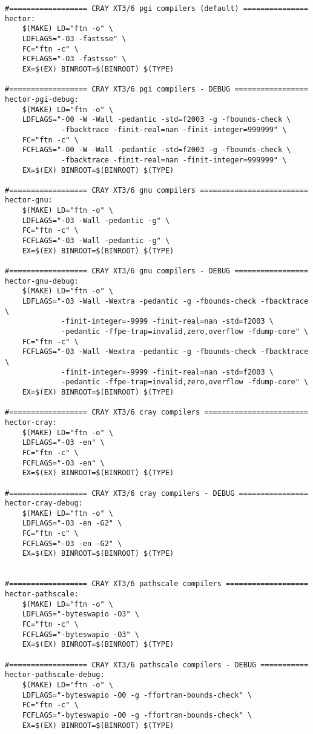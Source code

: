 \begin{verbatim}
#================== CRAY XT3/6 pgi compilers (default) ===============
hector:
	$(MAKE) LD="ftn -o" \
	LDFLAGS="-O3 -fastsse" \
	FC="ftn -c" \
	FCFLAGS="-O3 -fastsse" \
	EX=$(EX) BINROOT=$(BINROOT) $(TYPE)

#================== CRAY XT3/6 pgi compilers - DEBUG =================
hector-pgi-debug:
	$(MAKE) LD="ftn -o" \
	LDFLAGS="-O0 -W -Wall -pedantic -std=f2003 -g -fbounds-check \
	         -fbacktrace -finit-real=nan -finit-integer=999999" \
	FC="ftn -c" \
	FCFLAGS="-O0 -W -Wall -pedantic -std=f2003 -g -fbounds-check \
	         -fbacktrace -finit-real=nan -finit-integer=999999" \
	EX=$(EX) BINROOT=$(BINROOT) $(TYPE)

#================== CRAY XT3/6 gnu compilers =========================
hector-gnu:
	$(MAKE) LD="ftn -o" \
	LDFLAGS="-O3 -Wall -pedantic -g" \
	FC="ftn -c" \
	FCFLAGS="-O3 -Wall -pedantic -g" \
	EX=$(EX) BINROOT=$(BINROOT) $(TYPE)

#================== CRAY XT3/6 gnu compilers - DEBUG =================
hector-gnu-debug:
	$(MAKE) LD="ftn -o" \
	LDFLAGS="-O3 -Wall -Wextra -pedantic -g -fbounds-check -fbacktrace \
	         -finit-integer=-9999 -finit-real=nan -std=f2003 \
	         -pedantic -ffpe-trap=invalid,zero,overflow -fdump-core" \
	FC="ftn -c" \
	FCFLAGS="-O3 -Wall -Wextra -pedantic -g -fbounds-check -fbacktrace \
	         -finit-integer=-9999 -finit-real=nan -std=f2003 \
	         -pedantic -ffpe-trap=invalid,zero,overflow -fdump-core" \
	EX=$(EX) BINROOT=$(BINROOT) $(TYPE)

#================== CRAY XT3/6 cray compilers ========================
hector-cray:
	$(MAKE) LD="ftn -o" \
	LDFLAGS="-O3 -en" \
	FC="ftn -c" \
	FCFLAGS="-O3 -en" \
	EX=$(EX) BINROOT=$(BINROOT) $(TYPE)

#================== CRAY XT3/6 cray compilers - DEBUG ================
hector-cray-debug:
	$(MAKE) LD="ftn -o" \
	LDFLAGS="-O3 -en -G2" \
	FC="ftn -c" \
	FCFLAGS="-O3 -en -G2" \
	EX=$(EX) BINROOT=$(BINROOT) $(TYPE)


#================== CRAY XT3/6 pathscale compilers ===================
hector-pathscale:
	$(MAKE) LD="ftn -o" \
	LDFLAGS="-byteswapio -O3" \
	FC="ftn -c" \
	FCFLAGS="-byteswapio -O3" \
	EX=$(EX) BINROOT=$(BINROOT) $(TYPE)

#================== CRAY XT3/6 pathscale compilers - DEBUG ===========
hector-pathscale-debug:
	$(MAKE) LD="ftn -o" \
	LDFLAGS="-byteswapio -O0 -g -ffortran-bounds-check" \
	FC="ftn -c" \
	FCFLAGS="-byteswapio -O0 -g -ffortran-bounds-check" \
	EX=$(EX) BINROOT=$(BINROOT) $(TYPE)


\end{verbatim}
